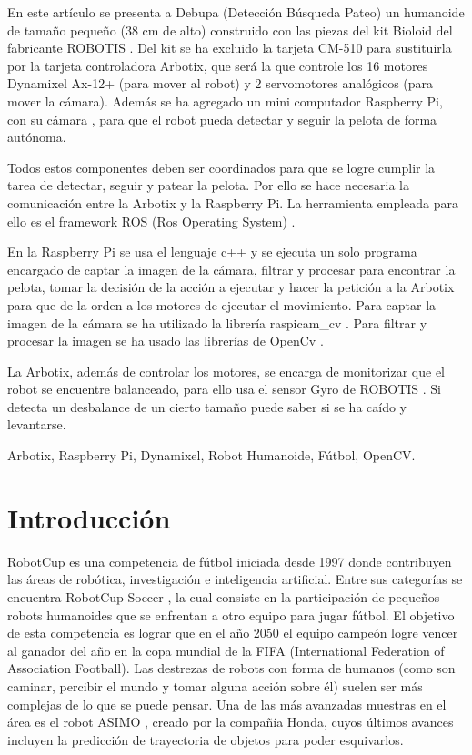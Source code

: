 \documentclass[tikz,conference, letterpaper]{IEEEtranMC1}
\begin{document}
\begin{abstractSP}
En este artículo se presenta a Debupa (Detección Búsqueda Pateo) un humanoide de tamaño pequeño (38 cm de alto) construido con las piezas del kit Bioloid \cite{robotics} del fabricante ROBOTIS \cite{robotics1}. Del kit se ha excluido la tarjeta CM-510 para sustituirla por la tarjeta controladora Arbotix, que será la que controle los 16 motores Dynamixel Ax-12+ (para mover al robot) y 2 servomotores analógicos (para mover la cámara). Además se ha agregado un mini computador Raspberry Pi, con su cámara \cite{raspberrycam}, para que el robot pueda detectar y seguir la pelota de forma autónoma. 

Todos estos componentes deben ser coordinados para que se logre cumplir la tarea de detectar, seguir y patear la pelota. Por ello se hace necesaria la comunicación entre la Arbotix y la Raspberry Pi. La herramienta empleada para ello es el framework ROS (Ros Operating System) \cite{ros}.

En la Raspberry Pi se usa el lenguaje c++ y se ejecuta un solo programa encargado de captar la imagen de la cámara, filtrar y procesar para encontrar la pelota, tomar la decisión de la acción a ejecutar y hacer la petición a la Arbotix para que de la orden a los motores de ejecutar el movimiento. Para captar la imagen de la cámara se ha utilizado la librería raspicam\_cv \cite{camara}. Para filtrar y procesar la imagen se ha usado las librerías de OpenCv \cite{opencv}. 

La Arbotix, además de controlar los motores, se encarga de monitorizar que el robot se encuentre balanceado, para ello usa el sensor Gyro de ROBOTIS \cite{gyro}. Si detecta un desbalance de un cierto tamaño puede saber si se ha caído y levantarse. 

\end{abstractSP}

\begin{IEEEkeywordsSP}
Arbotix, Raspberry Pi, Dynamixel, Robot Humanoide, Fútbol, OpenCV.
\end{IEEEkeywordsSP}


\IEEEpeerreviewmaketitle

\section{Introducci\'on}
RobotCup \cite{robotcup} es una competencia de fútbol iniciada desde 1997 donde contribuyen las áreas de robótica, investigación e inteligencia artificial. Entre sus categorías se encuentra RobotCup Soccer \cite{robotcupsoccer}, la cual consiste en la participación de pequeños robots humanoides que se enfrentan a otro equipo para jugar fútbol. El objetivo de esta competencia es lograr que en el año 2050 el equipo campeón logre vencer al ganador del año en la copa mundial de la FIFA (International Federation of Association Football). Las destrezas de robots con forma de humanos (como son caminar, percibir el mundo y tomar alguna acción sobre él) suelen ser más complejas de lo que se puede pensar. Una de las más avanzadas muestras en el área es el robot ASIMO \cite{asimo}, creado por la compañía Honda, cuyos últimos avances incluyen la predicción de trayectoria de objetos para poder esquivarlos.
\end{document}
